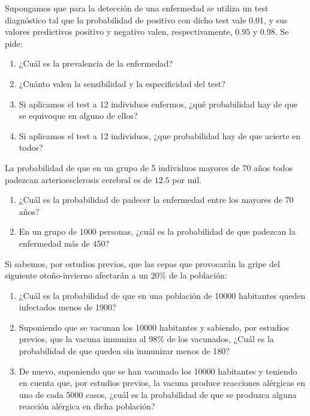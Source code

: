 {Supongamos que para la detección de una enfermedad se utiliza un test diagnóstico tal que la probabilidad de positivo con dicho test vale
0,01, y sus valores predictivos positivo y negativo valen, respectivamente, $0.95$ y $0.98$. Se pide:
\begin{enumerate}
\item ¿Cuál es la prevalencia de la enfermedad?
\item ¿Cuánto valen la sensibilidad y la especificidad del test?
\item Si aplicamos el test a 12 individuos enfermos, ¿qué probabilidad hay de que se equivoque en alguno de ellos?
\item Si aplicamos el test a 12 individuos, ¿que probabilidad hay de que acierte en todos?
\end{enumerate}
} 
{
}
{
}


{La probabilidad de que en un grupo de 5 individuos mayores de 70 años todos padezcan arterioesclerosis cerebral es de $12.5$ por mil.
\begin{enumerate}
\item ¿Cuál es la probabilidad de padecer la enfermedad entre los mayores de 70 años?
\item En un grupo de 1000 personas, ¿cuál es la probabilidad de que padezcan la enfermedad más de 450?
\end{enumerate}
} 
{
}
{
}


{Si sabemos, por estudios previos, que las cepas que provocarán la gripe del siguiente otoño-invierno afectarán a un 20\% de la
población:
\begin{enumerate}
\item ¿Cuál es la probabilidad de que en una población de 10000 habitantes queden infectados menos de 1900?
\item Suponiendo que se vacunan los 10000 habitantes y sabiendo, por estudios previos, que la vacuna inmuniza al 98\% de los vacunados,
¿Cuál es la probabilidad de que queden sin inmunizar menos de 180?
\item De nuevo, suponiendo que se han vacunado los 10000 habitantes y teniendo en cuenta que, por estudios previos, la vacuna produce
reacciones alérgicas en uno de cada 5000 casos, ¿cuál es la probabilidad de que se produzca alguna reacción alérgica en dicha población?
\end{enumerate}
} 
{
}
{
}

